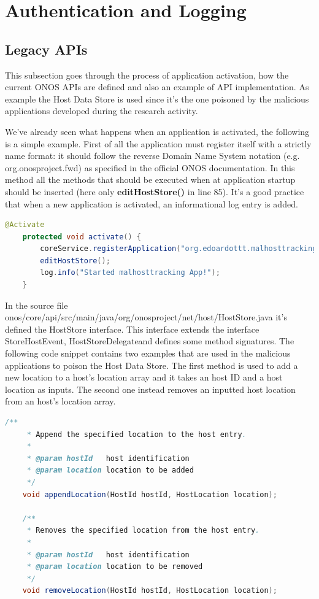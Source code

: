 \clearpage

\section{Authentication and Logging}

\subsection{Legacy APIs}
This subsection goes through the process of application activation, how the current ONOS APIs are defined and also an example of API implementation. As example the Host Data Store is used since it's the one poisoned by the malicious applications developed during the research activity.
\medskip

We've already seen what happens when an application is activated, the following is a simple example. First of all the application must register itself with a strictly name format: it should follow the reverse Domain Name System notation (e.g. org.onosproject.fwd) as specified in the official ONOS documentation. In this method all the methods that should be executed when at application startup should be inserted (here only \textbf{editHostStore()} in line 85). It's a good practice that when a new application is activated, an informational log entry is added.
\begin{lstlisting}[language=java,firstnumber=82]
    @Activate
    protected void activate() {
        coreService.registerApplication("org.edoardottt.malhosttracking.app")
        editHostStore();
        log.info("Started malhosttracking App!");
    }
\end{lstlisting}

In the source file onos/core/api/src/main/java/org/onosproject/net/host/HostStore.java it's defined the HostStore interface. This interface extends the interface Store\textlangle HostEvent, HostStoreDelegate\textrangle and defines some method signatures. The following code snippet contains two examples that are used in the malicious applications to poison the Host Data Store. The first method is used to add a new location to a host's location array and it takes an host ID and a host location as inputs. The second one instead removes an inputted host location from an host's location array.
\begin{lstlisting}[language=java,firstnumber=102]
    /**
     * Append the specified location to the host entry.
     *
     * @param hostId   host identification
     * @param location location to be added
     */
    void appendLocation(HostId hostId, HostLocation location);

    /**
     * Removes the specified location from the host entry.
     *
     * @param hostId   host identification
     * @param location location to be removed
     */
    void removeLocation(HostId hostId, HostLocation location);
\end{lstlisting}

